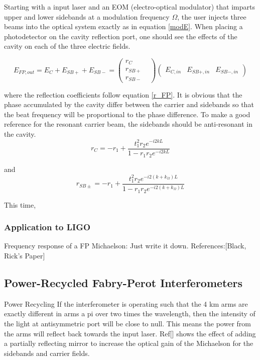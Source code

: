 		Starting with a input laser and an EOM (electro-optical modulator) that imparts upper and lower sidebands at a modulation frequency $\Omega$, the user injects three beams into the optical system exactly as in equation \ref{modE}.  When placing a photodetector on the cavity reflection port, one should see the effects of the cavity on each of the three electric fields.
		
		\begin{equation}
		E_{FP,out} = E_{C} + E_{SB+} + E_{SB-} = 
		\begin{pmatrix}
		r_{C} 	&   
		\\ 	r_{SB+} &
		\\ 	r_{SB-} &
		\end{pmatrix}
		\begin{pmatrix}
		E_{C,in} &    E_{SB+,in}    &  E_{SB-,in}     
		\end{pmatrix}
		\end{equation}
		
		where the reflection coefficients follow equation \ref{r_FP}.  It is obvious that the phase accumulated by the cavity differ between the carrier and sidebands so that the beat frequency will be proportional to the phase difference.  To make a good reference for the resonant carrier beam, the sidebands should be anti-resonant in the cavity.  
		\begin{equation}
		r_{C} = -r_1 + \frac{t_1^2 r_2  e^{-i2kL}}{1-r_1 r_2 e^{-i2kL}}
		\end{equation}
		
		and 
		\begin{equation}
		r_{SB\pm} = -r_1 + \frac{t_1^2 r_2  e^{-i2(k+k_{\Omega})L}}{1-r_1 r_2 e^{-i2(k+k_{\Omega})L}}
		\end{equation}
		
		This time, 
		
		\subsubsection{Application to LIGO}
		
		Frequency response of a FP Michaelson:
		Just write it down.
		References:[Black, Rick's Paper]

		\subsection{Power-Recycled Fabry-Perot Interferometers}
		Power Recycling
		If the interferometer is operating such that the 4 km arms are exactly different in arms a pi over two times the wavelength, then the intensity of the light at antisymmetric port will be close to null.  This means the power from the arms will reflect back towards the input laser.  Ref[] shows the effect of adding a partially reflecting mirror to increase the optical gain of the Michaelson for the sidebands and carrier fields.
		
